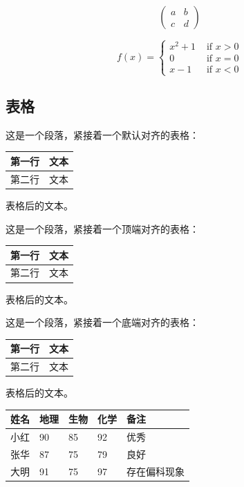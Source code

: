 \documentclass{article}
\begin{document}
\[
\begin{pmatrix}
a&b \\
c&d
\end{pmatrix}
\]

\[
f(x) =
\begin{cases}
x^2+1 & \text{ if } x>0 \\
0 & \text{ if } x = 0 \\
x-1 & \text{ if } x<0
\end{cases}
\]

\subsection{表格} \label{sec:table}
这是一个段落，紧接着一个默认对齐的表格：
\begin{tabular}{|l|l|}
\hline
第一行&文本 \\
\hline
第二行&文本 \\
\hline
\end{tabular}
表格后的文本。

\vspace{1cm}  %

这是一个段落，紧接着一个顶端对齐的表格：
\begin{tabular}[t]{|l|l|}
\hline
第一行&文本 \\
\hline
第二行&文本 \\
\hline
\end{tabular}
表格后的文本。

\vspace{1cm}   %

这是一个段落，紧接着一个底端对齐的表格：
\begin{tabular}[b]{|l|l|}
\hline
第一行&文本 \\
\hline
第二行&文本 \\
\hline
\end{tabular}
表格后的文本。

\vspace{1cm}   %

\begin{tabular}{|c|lll|p{4em}|}  
\hline
姓名&地理&生物&化学&备注 \\ 
\hline
小红&90&85&92&优秀 \\ 
\hline
张华&87&75&79&良好 \\ 
\hline
大明&91&75&97&存在偏科现象 \\ 
\hline
\end{tabular}

\vspace{1cm}   %
\end{document}
